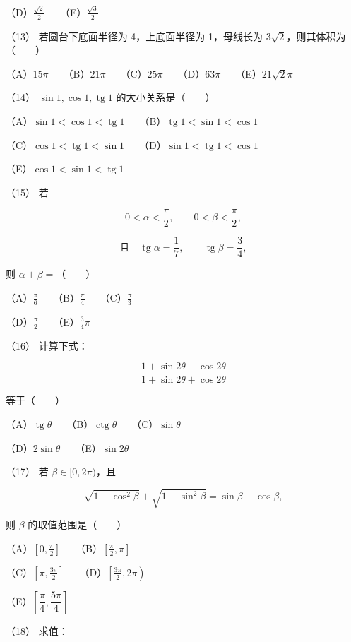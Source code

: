\begin{question}
（D）$\frac{\sqrt2}{2}$　　（E）$\frac{\sqrt3}{2}$

（13） 若圆台下底面半径为 4，上底面半径为 1，母线长为 $3\sqrt2$，则其体积为\mbox{（　　）}

（A）$15\pi$　　（B）$21\pi$　　（C）$25\pi$　　（D）$63\pi$　　（E）$21\sqrt2\pi$

（14） $\sin1,\cos1,\operatorname{tg}1$ 的大小关系是\mbox{（　　）}

（A）$\sin1<\cos1<\operatorname{tg}1$　　（B）$\operatorname{tg}1<\sin1<\cos1$

（C）$\cos1<\operatorname{tg}1<\sin1$　　（D）$\sin1<\operatorname{tg}1<\cos1$

（E）$\cos1<\sin1<\operatorname{tg}1$


（15） 若

\nopagebreak[4]
\[
0<\alpha<\frac\pi2,\qquad 0<\beta<\frac\pi2,
\]

\nopagebreak[4]
\[
\text{且}\quad \operatorname{tg}\alpha=\frac17,\qquad \operatorname{tg}\beta=\frac34,
\]

则 $\alpha+\beta=$\mbox{（　　）}

（A）$\frac\pi6$　　（B）$\frac\pi4$　　（C）$\frac\pi3$

（D）$\frac\pi2$　　（E）$\frac34\pi$

（16） 计算下式：

\nopagebreak[4]
\[
\frac{1+\sin2\theta-\cos2\theta}
{1+\sin2\theta+\cos2\theta}
\]

等于\mbox{（　　）}

（A）$\operatorname{tg}\theta$　　（B）$\operatorname{ctg}\theta$　　（C）$\sin\theta$

（D）$2\sin\theta$　　（E）$\sin2\theta$

（17） 若 $\beta\in[0,2\pi)$，且

\nopagebreak[4]
\[
\sqrt{1-\cos^2\beta}+\sqrt{1-\sin^2\beta}
=\sin\beta-\cos\beta,
\]

则 $\beta$ 的取值范围是\mbox{（　　）}

（A）$\left[0,\frac\pi2\right]$　　（B）$\left[\frac\pi2,\pi\right]$

（C）$\left[\pi,\frac{3\pi}2\right]$　　（D）$\left[\frac{3\pi}2,2\pi\right)$

（E）$\left[\dfrac\pi4,\dfrac{5\pi}4\right]$

（18） 求值：


\end{question}
